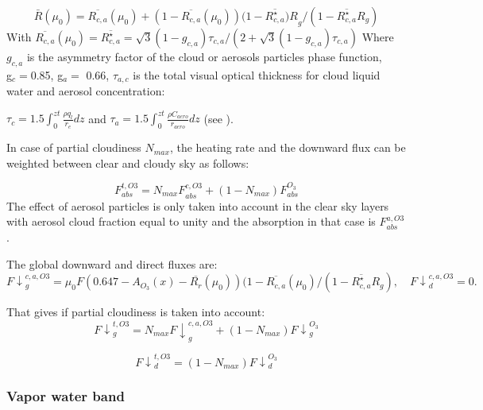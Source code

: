 \begin{equation}
\bar{R}\left( \mu_{0} \right)=\overline{R_{c,a}}\left( \mu_{0}
\right)+(1-\overline{R_{c,a}}\left( \mu_{0} \right))(1-\overline{R_{c,a}^{\star
}}{)R}_{g}/(1-\overline{R_{c,a}^{\star }}R_{g})
\end{equation}
With $\overline{R_{c,a}}\left( \mu_{0} \right)=\overline{R_{c,a}^{\star }}=\sqrt 3
\left( 1-g_{c,a} \right)\tau_{c,a}/(2+\sqrt 3 \left( 1-g_{c,a} \right)\tau
_{c,a})$
Where $g_{c,a}$ is the asymmetry factor of the cloud or aerosols
particles phase function, \\
g$_{c}=$0.85, g$_{a}=$ 0.66, $\tau_{a,c}$ is the total visual optical thickness
for cloud liquid water and aerosol concentration:

$\tau_{c}=1.5\int_0^{zt} \frac{\rho q_{l}}{r_{e}} dz$ and $\tau
_{a}=1.5\int_0^{zt} \frac{\rho C_{aero}}{r_{aero}} dz$ (see \cite{Stephens:1984}).

In case of partial cloudiness $N_{max}$, the heating rate and the downward
flux can be weighted between clear and cloudy sky as follows:

\begin{equation}
F_{abs}^{t,O3}={N_{max}F}_{abs}^{c,O3}+(1-N_{max})F_{abs}^{O_{3}}
\end{equation}
The effect of aerosol particles is only taken into account in the clear sky
layers with aerosol cloud fraction equal to unity and the absorption in that
case is $F_{abs}^{a,O3}$.

The global downward and direct fluxes are:
\begin{equation}
{F\downarrow }_{g}^{c,a,O3}=\mu_{0}F(0.647-A_{O_{3}}\left( x
\right)-\overline{R_{r}}\left( \mu_{0} \right))(1-\overline{R_{c,a}}\left( \mu_{0}
\right)/(1-\overline{R_{c,a}^{\star }}R_{g}),\quad
{F\downarrow }_{d}^{c,a,O3}=0.
\end{equation}

That gives if partial cloudiness is taken into account:
\begin{equation}
{F\downarrow }_{g}^{t,O3}={N_{max}F\downarrow
}_{g}^{c,a,O3}+(1-N_{max}){F\downarrow }_{g}^{O_{3}}
\end{equation}

\begin{equation}
{F\downarrow }_{d}^{t,O3}=(1-N_{max}){F\downarrow }_{d}^{O_{3}}
\end{equation}
\subsubsection{Vapor water band}

